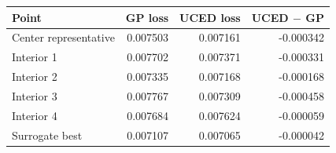 \begin{tabular}{@{}lrrr@{}}\toprule
Point & GP loss & UCED loss & UCED $-$ GP \\ \midrule
Center representative & 0.007503 & 0.007161 & -0.000342 \\
Interior 1 & 0.007702 & 0.007371 & -0.000331 \\
Interior 2 & 0.007335 & 0.007168 & -0.000168 \\
Interior 3 & 0.007767 & 0.007309 & -0.000458 \\
Interior 4 & 0.007684 & 0.007624 & -0.000059 \\
Surrogate best & 0.007107 & 0.007065 & -0.000042 \\
\bottomrule\end{tabular}

